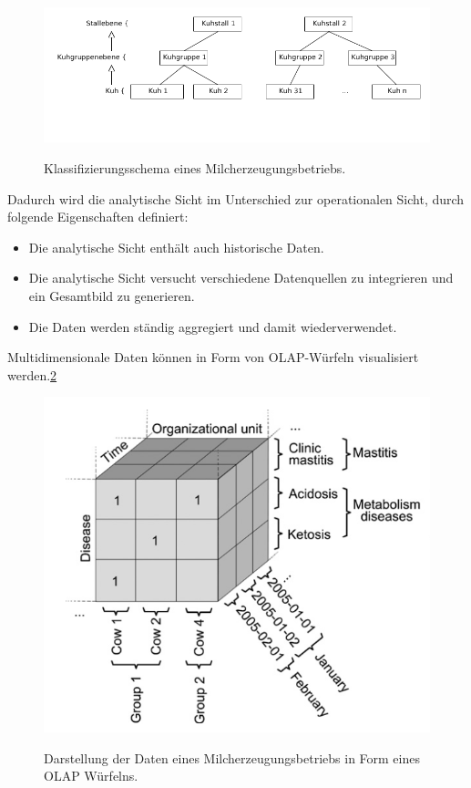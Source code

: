 \begin{figure}[h]
 \includegraphics[scale=0.5,natwidth=\textwidth]{figures/datamodelling/kuehe.png}
 \centering
 \label{fig:kuehe}
 \caption{Klassifizierungsschema eines Milcherzeugungsbetriebs.}
\end{figure}

Dadurch wird die analytische Sicht im Unterschied zur operationalen Sicht, durch folgende Eigenschaften definiert:
\begin{itemize}
	\item Die analytische Sicht enthält auch historische Daten.
	\item Die analytische Sicht versucht verschiedene Datenquellen zu integrieren und ein Gesamtbild zu generieren.
	\item Die Daten werden ständig aggregiert und damit wiederverwendet.
\end{itemize}

Multidimensionale Daten können in Form von OLAP-Würfeln visualisiert werden.\ref{fig:kuehe_olap} 

\begin{figure}[h]
 \includegraphics[scale=0.5,natwidth=\textwidth]{figures/datamodelling/kuehe_olap_wuerfel_schulze2007.png}
 \centering
 \label{fig:kuehe_olap}
 \caption{Darstellung der Daten eines Milcherzeugungsbetriebs in Form eines OLAP Würfelns.\cite{jour:Schulze2007}}
\end{figure}


